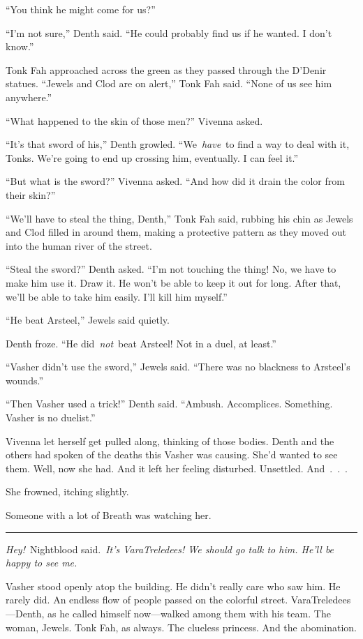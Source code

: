 “You think he might come for us?”

“I’m not sure,” Denth said. “He could probably find us if he wanted. I don’t know.”

Tonk Fah approached across the green as they passed through the D’Denir statues. “Jewels and Clod are on alert,” Tonk Fah said. “None of us see him anywhere.”

“What happened to the skin of those men?” Vivenna asked.

“It’s that sword of his,” Denth growled. “We~\textit{have}~to find a way to deal with it, Tonks. We’re going to end up crossing him, eventually. I can feel it.”

“But what is the sword?” Vivenna asked. “And how did it drain the color from their skin?”

“We’ll have to steal the thing, Denth,” Tonk Fah said, rubbing his chin as Jewels and Clod filled in around them, making a protective pattern as they moved out into the human river of the street.

“Steal the sword?” Denth asked. “I’m not touching the thing! No, we have to make him use it. Draw it. He won’t be able to keep it out for long. After that, we’ll be able to take him easily. I’ll kill him myself.”

“He beat Arsteel,” Jewels said quietly.

Denth froze. “He did~\textit{not}~beat Arsteel! Not in a duel, at least.”

“Vasher didn’t use the sword,” Jewels said. “There was no blackness to Arsteel’s wounds.”

“Then Vasher used a trick!” Denth said. “Ambush. Accomplices. Something. Vasher is no duelist.”

Vivenna let herself get pulled along, thinking of those bodies. Denth and the others had spoken of the deaths this Vasher was causing. She’d wanted to see them. Well, now she had. And it left her feeling disturbed. Unsettled. And~.~.~.

She frowned, itching slightly.

Someone with a lot of Breath was watching her.

\bigskip \hrule \bigskip

\textit{Hey!}~Nightblood said.~\textit{It’s VaraTreledees! We should go talk to him. He’ll be happy to see me.}

Vasher stood openly atop the building. He didn’t really care who saw him. He rarely did. An endless flow of people passed on the colorful street. VaraTreledees—Denth, as he called himself now—walked among them with his team. The woman, Jewels. Tonk Fah, as always. The clueless princess. And the abomination.

